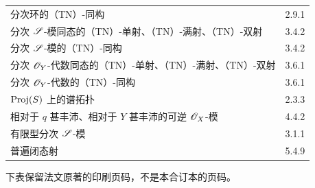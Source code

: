 \begin{longtable}{@{}p{}@{\hspace{1em}}p{}@{}}
分次环的（TN）-同构 &2.9.1\\
分次 $\mathscr S$-模同态的（TN）-单射、（TN）-满射、（TN）-双射 &3.4.2\\
分次 $\mathscr S$-模的（TN）-同构 &3.4.2\\
分次 $\mathscr O_Y$-代数同态的（TN）-单射、（TN）-满射、（TN）-双射 &3.6.1\\
分次 $\mathscr O_Y$-代数的（TN）-同构 &3.6.1\\
$\operatorname{Proj}(S)$ 上的谱拓扑 &2.3.3\\
相对于 $q$ 甚丰沛、相对于 $Y$ 甚丰沛的可逆 $\mathscr O_X$-模 &4.4.2\\
有限型分次 $\mathscr S$-模 &3.1.1\\
普遍闭态射 &5.4.9\\
\end{longtable}
\endgroup

\noindent 下表保留法文原著的印刷页码，不是本合订本的页码。
\begingroup\small
